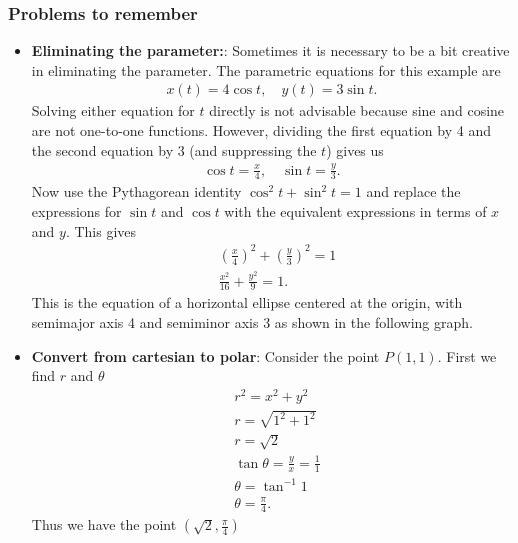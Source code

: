 \documentclass{report}
\begin{document}
    \subsubsection{Problems to remember}
    \begin{itemize}
        \item \textbf{Eliminating the parameter:}:
            Sometimes it is necessary to be a bit creative in eliminating the parameter. The parametric equations for this example are
            \begin{align*}
                x(t) = 4\cos{t}, \quad y(t) = 3\sin{t}
            .\end{align*}
            \bigbreak \noindent 
            Solving either equation for $t$ directly is not advisable because sine and cosine are not one-to-one functions. However, dividing the first equation by 4 and the second equation by 3 (and suppressing the $t$) gives us
            \begin{align*}
                \cos{t} = \frac{x}{4}, \quad \sin{t} = \frac{y}{3}
            .\end{align*}
            \bigbreak \noindent 
            Now use the Pythagorean identity  $\cos^{2}{t} + \sin^{2}{t} = 1$ and replace the expressions for $\sin{t}$ and $\cos{t}$ with the equivalent expressions in terms of $x$ and $y$. This gives
            \begin{align*}
        &\left(\frac{x}{4}\right)^{2} +  \left(\frac{y}{3}\right)^{2} = 1 \\
        &\frac{x^{2}}{16}  + \frac{y^{2}}{9} = 1
    .\end{align*}
    \bigbreak \noindent 
    This is the equation of a horizontal ellipse centered at the origin, with semimajor axis 4 and semiminor axis 3 as shown in the following graph. 
    \item \textbf{Convert from cartesian to polar}: Consider the point $P(1,1)$. First we find $r$ and $\theta$
        \begin{align*}
            &r^{2} = x^{2} + y^{2} \\
            &r = \sqrt{1^{2} + 1^{2}} \\
            &r=\sqrt{2} \\
            &\tan{\theta } = \frac{y}{x} = \frac{1}{1} \\
            &\theta  = \tan^{-1}{1} \\
            &\theta  = \frac{\pi}{4}
        .\end{align*}
        Thus we have the point $\left(\sqrt{2}, \frac{\pi}{4}\right) $

\end{itemize}
\end{document}
